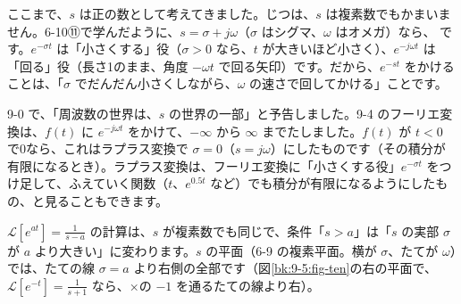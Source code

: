 
\label{bk:9-5:fukuso}ここまで、$s$ は正の数として考えてきました。じつは、$s$ は複素数でもかまいません。6-10⑪で学んだように、$s=\sigma+j\omega$（$\sigma$ はシグマ、$\omega$ はオメガ）なら、
です。$e^{-\sigma t}$ は「小さくする」役（$\sigma>0$ なら、$t$ が大きいほど小さく）、$e^{-j\omega t}$ は「回る」役（長さ1のまま、角度 $-\omega t$ で回る矢印）です。だから、$e^{-st}$ をかけることは、「$\sigma$ でだんだん小さくしながら、$\omega$ の速さで回してかける」ことです。

\begin{bkfigure}
\label{bk:9-5:fig-fukuso}
\end{bkfigure}

9-0 で、「周波数の世界は、$s$ の世界の一部」と予告しました。9-4 のフーリエ変換は、$f(t)$ に $e^{-j\omega t}$ をかけて、$-\infty$ から $\infty$ までたしました。$f(t)$ が $t<0$ で0なら、これはラプラス変換で $\sigma=0$（$s=j\omega$）にしたものです（その積分が有限になるとき）。ラプラス変換は、フーリエ変換に「小さくする役」$e^{-\sigma t}$ をつけ足して、ふえていく関数（$t$、$e^{0.5t}$ など）でも積分が有限になるようにしたもの、と見ることもできます。

$\mathcal L[e^{at}]=\tfrac{1}{s-a}$ の計算は、$s$ が複素数でも同じで、条件「$s>a$」は「$s$ の実部 $\sigma$ が $a$ より大きい」に変わります。$s$ の平面（6-9 の複素平面。横が $\sigma$、たてが $\omega$）では、たての線 $\sigma=a$ より右側の全部です（図\ref{bk:9-5:fig-ten}の右の平面で、$\mathcal L[e^{-t}]=\frac{1}{s+1}$ なら、×の $-1$ を通るたての線より右）。



